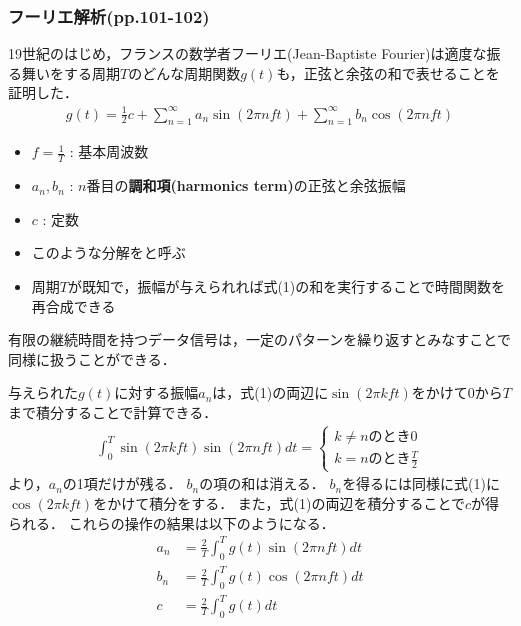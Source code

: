 \documentclass[a4paper]{ltjsarticle}
\begin{document}
		\subsubsection{フーリエ解析(pp.101-102)}
			19世紀のはじめ，フランスの数学者フーリエ(Jean-Baptiste Fourier)は適度な振る舞いをする周期$T$のどんな周期関数$g(t)$も，正弦と余弦の和で表せることを証明した．
			\begin{align}
				g(t) = \frac{1}{2}c + \sum^{\infty}_{n=1} a_n \sin(2\pi nft) + \sum^{\infty}_{n=1} b_n \cos(2\pi nft)
			\end{align}
			\begin{itemize}
				\item $f=\frac{1}{T}$ : 基本周波数
				\item $a_n,b_n$ : $n$番目の{\gtfamily\textbf{調和項(harmonics term)}}の正弦と余弦振幅
				\item $c$ : 定数
				\item このような分解をと呼ぶ
				\item 周期$T$が既知で，振幅が与えられれば式(1)の和を実行することで時間関数を再合成できる
			\end{itemize}
			有限の継続時間を持つデータ信号は，一定のパターンを繰り返すとみなすことで同様に扱うことができる．\par
			与えられた$g(t)$に対する振幅$a_n$は，式(1)の両辺に$\sin(2\pi kft)$をかけて$0$から$T$まで積分することで計算できる．
			\begin{align}
				\int^T_0 \sin(2\pi kft) \sin(2\pi nft) dt =
				\begin{cases}
					k \neq n \text{のとき} 0 \\
					k = n \text{のとき} \frac{T}{2}
				\end{cases}
			\end{align}
			より，$a_n$の1項だけが残る．
			$b_n$の項の和は消える．
			$b_n$を得るには同様に式(1)に$\cos(2\pi kft)$をかけて積分をする．
			また，式(1)の両辺を積分することで$c$が得られる．
			これらの操作の結果は以下のようになる．
			\begin{align}
				a_n &= \frac{2}{T} \int^T_0 g(t) \sin(2\pi nft)dt \\
				b_n &= \frac{2}{T} \int^T_0 g(t) \cos(2\pi nft)dt \\
				c &= \frac{2}{T} \int^T_0 g(t) dt
			\end{align}
\end{document}
